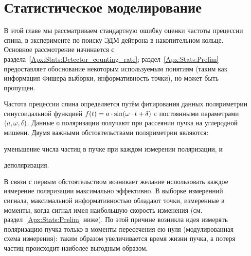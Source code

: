\newcommand{\cnt}{c}
\newcommand{\meas}{\epsilon}
\newcommand{\dt}{\Delta t}
\newcommand{\dtm}{\dt_{\meas}}
\newcommand{\dtc}{\dt_{\cnt}}
\newcommand{\Ncm}{{n_{\sfrac{\cnt}{\meas}}}}
\newcommand{\Nmnd}{{n_{\sfrac{\meas}{zc}}}}
\newcommand{\Nnd}{{n_{zc}}}
\newcommand{\Nm}{{n_{\meas}}}
\newcommand{\Ncnt}{{n_{\cnt}}}
\newcommand{\LTb}{\tau_b}
\newcommand{\LTd}{\tau_d}
\newcommand{\lamb}{\lambda_b}
\newcommand{\lamd}{\lambda_d}

\newcommand{\pars}{\boldsymbol{\theta}}
\DeclareDocumentCommand{\XpctO}{m}{\Xpct{#1}[\pars_0]}
\DeclareDocumentCommand{\Fisher}{O{}D(){\pars_0}}{I_{#1}(#2)}
\newcommand{\y}{\mathbf{y}}


\chapter{Статистическое моделирование}\label{Apx:Stats}
В этой главе мы рассматриваем стандартную ошибку оценки частоты прецессии спина, 
в эксперименте по поиску ЭДМ дейтрона в накопительном кольце. 
Основное рассмотрение начинается с раздела~\ref{Apx:Stats:Detector_counting_rate}; 
раздел~\ref{Apx:Stats:Prelim} предоставляет обоснование некоторым используемым понятиям 
(таким как информация Фишера выборки, информативность точки), но может быть пропущен.

Частота прецессии спина определяется путём фитирования данных поляриметрии синусоидальной функцией
 ${f(t) = a\cdot\sin(\omega\cdot t + \delta)}$ с постоянными параметрами $(a,\omega,\delta)$. 
 Данные о поляризации получают при рассеянии пучка на углеродной мишени. 
 Двумя важными обстоятельствами поляриметрии являются:
\begin{enumerate*}[(1)]
	\item уменьшение числа частиц в пучке при каждом измерении поляризации, и
	\item деполяризация.
\end{enumerate*}

В связи с первым обстоятельством возникает желание использовать каждое измерение поляризации 
максимально эффективно. В выборке измеренний сигнала, максимальной информативностью обладают точки,
измеренные в моменты, когда сигнал имел наибольшую скорость изменения 
(см. раздел~\ref{Apx:Stats:Prelim} ниже). По этой причине возникла идея измерять поляризацию пучка 
только в моменты пересечения ею нуля (модулированная схема измерения): 
таким образом увеличивается время жизни пучка, а потеря частиц происходит наиболее выгодным образом. 

